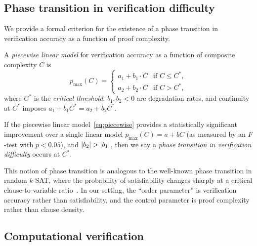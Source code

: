 \subsection{Phase transition in verification difficulty}\label{sec:phase}

We provide a formal criterion for the existence of a phase transition in
verification accuracy as a function of proof complexity.

\begin{definition}\label{def:piecewise}
A \emph{piecewise linear model} for verification accuracy as a function of
composite complexity $C$ is
\begin{equation}\label{eq:piecewise}
p_{\max}(C) = \begin{cases}
  a_1 + b_1 \cdot C & \text{if } C \le C^*, \\
  a_2 + b_2 \cdot C & \text{if } C > C^*,
\end{cases}
\end{equation}
where $C^*$ is the \emph{critical threshold}, $b_1, b_2 < 0$ are degradation
rates, and continuity at $C^*$ imposes $a_1 + b_1 C^* = a_2 + b_2 C^*$.
\end{definition}

\begin{proposition}\label{prop:phase-transition}
If the piecewise linear model~\eqref{eq:piecewise} provides a statistically
significant improvement over a single linear model $p_{\max}(C) = a + bC$
(as measured by an $F$-test with $p < 0.05$), and $\lvert b_2\rvert > \lvert b_1\rvert$,
then we say a \emph{phase transition in verification difficulty} occurs at
$C^*$.
\end{proposition}

\begin{remark}\label{rem:phase-analogy}
This notion of phase transition is analogous to the well-known phase
transition in random $k$-SAT, where the probability of satisfiability changes
sharply at a critical clause-to-variable ratio~\cite{mezard2002analytic}.
In our setting, the ``order parameter'' is verification accuracy rather than
satisfiability, and the control parameter is proof complexity rather than
clause density.
\end{remark}

\subsection{Computational verification}\label{sec:computation}

